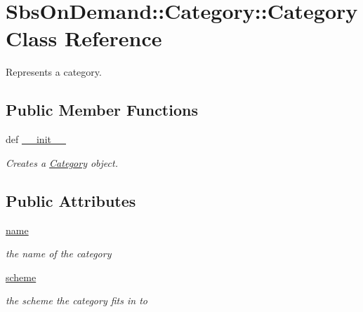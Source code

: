 \hypertarget{class_sbs_on_demand_1_1_category_1_1_category}{
\section{\-Sbs\-On\-Demand\-:\-:\-Category\-:\-:\-Category \-Class \-Reference}
\label{class_sbs_on_demand_1_1_category_1_1_category}
}


\-Represents a category.  


\subsection*{\-Public \-Member \-Functions}
\begin{DoxyCompactItemize}
\item 
def \hyperlink{class_sbs_on_demand_1_1_category_1_1_category_aba0292d1eca6dd3439256010ded8fbe2}{\-\_\-\-\_\-init\-\_\-\-\_\-}
\begin{DoxyCompactList}\small\item\em \-Creates a \hyperlink{class_sbs_on_demand_1_1_category_1_1_category}{\-Category} object. \end{DoxyCompactList}\end{DoxyCompactItemize}
\subsection*{\-Public \-Attributes}
\begin{DoxyCompactItemize}
\item 
\hypertarget{class_sbs_on_demand_1_1_category_1_1_category_a1947c2839e74b0aa37daf00d0dee2bd3}{
\hyperlink{class_sbs_on_demand_1_1_category_1_1_category_a1947c2839e74b0aa37daf00d0dee2bd3}{name}}
\label{class_sbs_on_demand_1_1_category_1_1_category_a1947c2839e74b0aa37daf00d0dee2bd3}

\begin{DoxyCompactList}\small\item\em the name of the category \end{DoxyCompactList}\item 
\hypertarget{class_sbs_on_demand_1_1_category_1_1_category_a582960421e4a326d0d0444ee2cc98281}{
\hyperlink{class_sbs_on_demand_1_1_category_1_1_category_a582960421e4a326d0d0444ee2cc98281}{scheme}}
\label{class_sbs_on_demand_1_1_category_1_1_category_a582960421e4a326d0d0444ee2cc98281}

\begin{DoxyCompactList}\small\item\em the scheme the category fits in to \end{DoxyCompactList}\end{DoxyCompactItemize}


